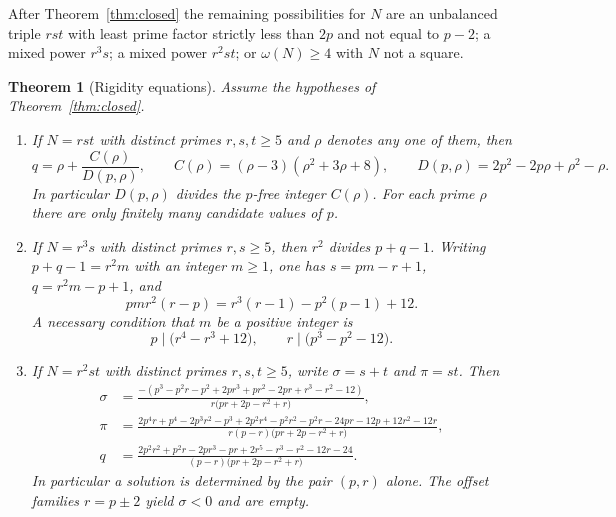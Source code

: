 \documentclass[11pt,reqno]{amsart}
\newtheorem{theorem}{Theorem}
\theoremstyle{definition}
\begin{document}
After Theorem~\ref{thm:closed} the remaining possibilities for \(N\) are an unbalanced triple \(rst\) with least prime factor
strictly less than \(2p\) and not equal to \(p-2\); a mixed power \(r^3s\); a mixed power \(r^2st\); or \(\omega(N)\ge 4\)
with \(N\) not a square.

\begin{theorem}[Rigidity equations]
\label{thm:rigid}
Assume the hypotheses of Theorem~\ref{thm:closed}.
\begin{enumerate}
\item[\textup{(a)}]
If \(N=rst\) with distinct primes \(r,s,t\ge 5\) and \(\rho\) denotes any one of them, then
\begin{equation}
\label{eq:qCD}
q=\rho+\frac{C(\rho)}{D(p,\rho)},\qquad
C(\rho)=(\rho-3)(\rho^2+3\rho+8),\qquad
D(p,\rho)=2p^2-2p\rho+\rho^2-\rho.
\end{equation}
In particular \(D(p,\rho)\) divides the \(p\)-free integer \(C(\rho)\). For each prime \(\rho\) there are only finitely many candidate values of \(p\).
\item[\textup{(b)}]
If \(N=r^3s\) with distinct primes \(r,s\ge 5\), then \(r^2\) divides \(p+q-1\). Writing \(p+q-1=r^2m\) with an integer \(m\ge 1\), one has \(s=pm-r+1\), \(q=r^2m-p+1\), and
\begin{equation}
\label{eq:r3s}
pmr^2(r-p)=r^3(r-1)-p^2(p-1)+12.
\end{equation}
A necessary condition that \(m\) be a positive integer is
\begin{equation}
\label{eq:dual}
p\mid\bigl(r^4-r^3+12\bigr),\qquad r\mid\bigl(p^3-p^2-12\bigr).
\end{equation}
\item[\textup{(c)}]
If \(N=r^2st\) with distinct primes \(r,s,t\ge 5\), write \(\sigma=s+t\) and \(\pi=st\). Then
\begin{align}
\label{eq:r2st-sig}
\sigma&=\frac{-(p^3-p^2r-p^2+2pr^3+pr^2-2pr+r^3-r^2-12)}{r\bigl(pr+2p-r^2+r\bigr)},\\
\label{eq:r2st-pi}
\pi&=\frac{2p^4r+p^4-2p^3r^2-p^3+2p^2r^4-p^2r^2-p^2r-24pr-12p+12r^2-12r}{r(p-r)\bigl(pr+2p-r^2+r\bigr)},\\
\label{eq:r2st-q}
q&=\frac{2p^2r^2+p^2r-2pr^3-pr+2r^5-r^3-r^2-12r-24}{(p-r)\bigl(pr+2p-r^2+r\bigr)}.
\end{align}
In particular a solution is determined by the pair \((p,r)\) alone. The offset families \(r=p\pm 2\) yield \(\sigma<0\) and are empty.
\end{enumerate}
\end{theorem}
\end{document}

